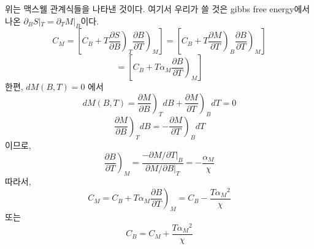 \documentclass[a4paper,12pt]{article}
\begin{document}
위는 맥스웰 관계식들을 나타낸 것이다. 여기서 우리가 쓸 것은 gibbs free energy에서 나온  $\partial_B S|_T=\partial_T M|_B$이다.
$$C_M=\left[C_B+T\left.\frac{\partial S}{\partial B} \right)_T \left.\frac{\partial B}{\partial T} \right)_M \right]=\left[C_B+T\left.\frac{\partial M}{\partial T} \right)_B \left.\frac{\partial B}{\partial T} \right)_M \right]$$
$$=\left[C_B+T\alpha_M \left.\frac{\partial B}{\partial T} \right)_M \right]$$
한편, $dM(B,T)=0$ 에서
$$dM(B,T)=\left.\frac{\partial M}{\partial B} \right)_T dB+\left.\frac{\partial M}{\partial T} \right)_B dT=0 $$
$$\left.\frac{\partial M}{\partial B} \right)_T dB=-\left.\frac{\partial M}{\partial T} \right)_B dT$$
이므로,
$$\left.\frac{\partial B}{\partial T} \right)_M=\frac{-\partial M/\partial T|_B}{\partial M/\partial B|_T}=-\frac{\alpha_M}{\chi}$$
따라서, 
$$C_M=C_B+T\alpha_M \left.\frac{\partial B}{\partial T} \right)_M=C_B-\frac{T{\alpha_M}^2}{\chi}$$
또는 
$$C_B=C_M+\frac{T{\alpha_M}^2}{\chi}$$
\end{document}
